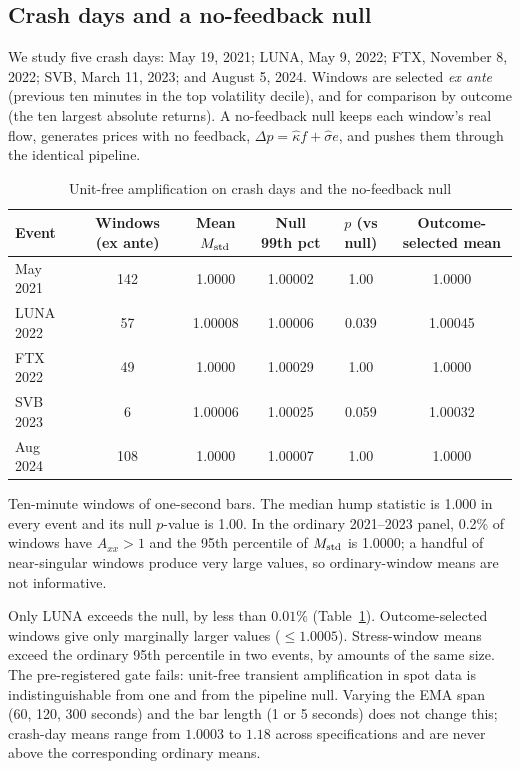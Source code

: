 \documentclass[12pt]{article}
\theoremstyle{definition}
\theoremstyle{remark}
\begin{document}
\subsection{Crash days and a no-feedback null}
We study five crash days: May 19, 2021; LUNA, May 9, 2022; FTX, November 8, 2022; SVB, March 11, 2023; and August 5, 2024. Windows are selected \emph{ex ante} (previous ten minutes in the top volatility decile), and for comparison by outcome (the ten largest absolute returns). A no-feedback null keeps each window's real flow, generates prices with no feedback, $\Delta p=\hat\kappa f+\hat\sigma e$, and pushes them through the identical pipeline.

\begin{table}[t]\centering\small
\begin{threeparttable}
\caption{Unit-free amplification on crash days and the no-feedback null}\label{tab:spotnull}
\begin{tabular}{lccccc}
\toprule
Event & Windows (ex ante) & Mean $M_{\rm std}$ & Null 99th pct & $p$ (vs null) & Outcome-selected mean\\
\midrule
May 2021 & 142 & 1.0000 & 1.00002 & 1.00 & 1.0000\\
LUNA 2022 & 57 & 1.00008 & 1.00006 & 0.039 & 1.00045\\
FTX 2022 & 49 & 1.0000 & 1.00029 & 1.00 & 1.0000\\
SVB 2023 & 6 & 1.00006 & 1.00025 & 0.059 & 1.00032\\
Aug 2024 & 108 & 1.0000 & 1.00007 & 1.00 & 1.0000\\
\bottomrule
\end{tabular}
\begin{tablenotes}\footnotesize\item Ten-minute windows of one-second bars. The median hump statistic is 1.000 in every event and its null $p$-value is 1.00. In the ordinary 2021--2023 panel, 0.2\% of windows have $A_{xx}>1$ and the 95th percentile of $M_{\rm std}$ is 1.0000; a handful of near-singular windows produce very large values, so ordinary-window means are not informative. \end{tablenotes}
\end{threeparttable}
\end{table}

Only LUNA exceeds the null, by less than $0.01\%$ (Table~\ref{tab:spotnull}). Outcome-selected windows give only marginally larger values ($\le1.0005$). Stress-window means exceed the ordinary 95th percentile in two events, by amounts of the same size. The pre-registered gate fails: unit-free transient amplification in spot data is indistinguishable from one and from the pipeline null. Varying the EMA span (60, 120, 300 seconds) and the bar length (1 or 5 seconds) does not change this; crash-day means range from $1.0003$ to $1.18$ across specifications and are never above the corresponding ordinary means.
\end{document}
